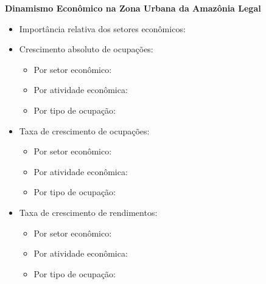 \documentclass[10pt]{beamer}
\begin{document}
\begin{frame}[label=indice_principal_amz_urbana]{}

\textit{\hyperlink{indice_principal}{}}

\textbf{Dinamismo Econômico na Zona Urbana da Amazônia Legal}
\vspace{2mm}

\begin{itemize}

\item{Importância relativa dos setores econômicos: \hyperlink{_amz_urbana_importancia_relativa}{}}
\vspace{1mm}

\item{Crescimento  absoluto de ocupações:
	\begin{itemize}
	\item{Por setor econômico: \hyperlink{amzurbanarkngnocuporsetor}{}}
	\item{Por atividade econômica: \hyperlink{amzurbanarkngnocuporatividade}{}}
	\item{Por tipo de ocupação: \hyperlink{amzurbanarkngnocuporocupacao}{}}
	\end{itemize}
}
\vspace{1mm}

\item{Taxa de crescimento de ocupações:
	\begin{itemize}
	\item{Por setor econômico: \hyperlink{amzurbanarkngtxocuporsetor}{}}
	\item{Por atividade econômica: \hyperlink{amzurbanarkngtxocuporatividade}{}}
	\item{Por tipo de ocupação: \hyperlink{amzurbanarkngtxocuporocupacao}{}}
	\end{itemize}
}
\vspace{1mm}

\item{Taxa de crescimento de rendimentos:
	\begin{itemize}
	\item{Por setor econômico: \hyperlink{amzurbanarkngtxrendaporsetor}{}}
	\item{Por atividade econômica: \hyperlink{amzurbanarkngtxrendaporatividade}{}}
	\item{Por tipo de ocupação: \hyperlink{amzurbanarkngtxrendaporocupacao}{}}
	\end{itemize}
}
\vspace{1mm}

\end{itemize}

\end{frame}
\end{document}
